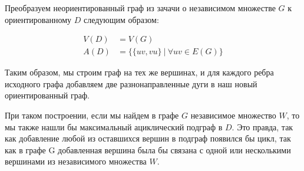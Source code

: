 Преобразуем неориентированный граф из зачачи о независимом множестве $G$
к ориентированному $D$ следующим образом:

\begin{align*}
    V(D) &= V(G) \\ 
    A(D) &= \{\{uv, vu\} ~|~ \forall uv \in E(G)\}
\end{align*}

Таким образом, мы строим граф на тех же вершинах, и для каждого ребра
исходного графа добавляем две разнонаправленные дуги в наш новый 
ориентированный граф.

При таком построении, если мы найдем в графе $G$ независимое множество $W$, то
мы также нашли бы максимальный ациклический подграф в $D$. Это правда, так как
добавление любой из оставшихся вершин в подграф появился бы цикл, так как
в графе G добавленная вершина была бы связана с одной или несколькими вершинами
из независимого множества $W$.


